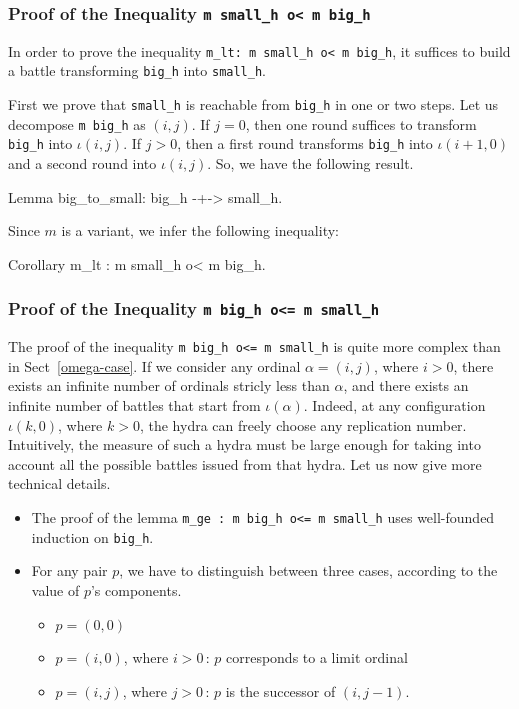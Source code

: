 \subsubsection{Proof of the Inequality \texttt{m small\_h o< m big\_h}}

In order to prove the inequality  \texttt{m\_lt: m small\_h o< m big\_h}, it suffices to
build a battle transforming \texttt{big\_h} into \texttt{small\_h}.

First we prove that \texttt{small\_h} is reachable from \texttt{big\_h} in one or two steps. Let us decompose \texttt{m big\_h} as $(i,j)$.
If $j=0$, then one round suffices to transform \texttt{big\_h} into $\iota(i,j)$.
If $j>0$, then a first round transforms \texttt{big\_h} into $\iota(i+1,0)$ and a second round into $\iota(i,j)$. So, we have the following result.

\begin{Coqsrc}
  Lemma big_to_small: big_h -+-> small_h.
\end{Coqsrc}

Since $m$ is a variant, we infer the following inequality:

\begin{Coqsrc}
   Corollary m_lt : m small_h o< m big_h.
\end{Coqsrc}


\subsubsection{Proof of the Inequality \texttt{m big\_h o<= m small\_h} }


The proof of the inequality \texttt{m big\_h o<= m small\_h} is quite more complex than in Sect~\ref{omega-case}.  If we consider any ordinal $\alpha=(i,j)$, where $i>0$, there exists an infinite number of
ordinals stricly less than $\alpha$, and there exists an infinite number of battles that start from
$\iota(\alpha)$. Indeed, at any configuration $\iota(k,0)$, where $k>0$, the hydra can freely choose any replication number. Intuitively, the measure of such a hydra must be large enough for taking into account
all the possible battles issued from that hydra.
Let us now give more technical details.

\begin{itemize}
\item The proof of the lemma \texttt{m\_ge : m big\_h  o<= m small\_h} uses well-founded induction on \texttt{big\_h}.

\item For any pair $p$, we have to distinguish between three cases, according to the value of $p$'s components.
  \begin{itemize}
  \item $p=(0,0)$
  \item $p=(i,0)$, where $i>0$\,: $p$ corresponds to a limit ordinal
  \item $p=(i,j)$, where $j>0$\,: $p$ is the successor of $(i,j-1)$.
  \end{itemize}
\end{itemize}


